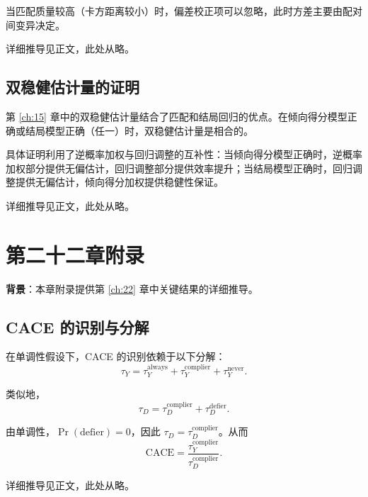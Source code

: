 当匹配质量较高（卡方距离较小）时，偏差校正项可以忽略，此时方差主要由配对间变异决定。

详细推导见正文，此处从略。

\subsection{双稳健估计量的证明}

第 \ref{ch:15} 章中的双稳健估计量结合了匹配和结局回归的优点。在倾向得分模型正确或结局模型正确（任一）时，双稳健估计量是相合的。

具体证明利用了逆概率加权与回归调整的互补性：当倾向得分模型正确时，逆概率加权部分提供无偏估计，回归调整部分提供效率提升；当结局模型正确时，回归调整提供无偏估计，倾向得分加权提供稳健性保证。

详细推导见正文，此处从略。

\section{第二十二章附录}\label{sec:appendix-22-asymptotic-variance}\label{sec:appendix-22-cace-proof}\label{sec:appendix-22-far-ci}\label{sec:appendix-22-itt-identification}\label{sec:appendix-22-jobs-analysis}\label{sec:appendix-22-monotonicity-implication}\label{sec:appendix-22-tau-d-decomposition}\label{sec:appendix-22-tau-y-decomposition}\label{sec:appendix-22-wald-delta-method}

\textbf{背景}：本章附录提供第 \ref{ch:22} 章中关键结果的详细推导。

\subsection{CACE 的识别与分解}

在单调性假设下，CACE 的识别依赖于以下分解：
\[
\tau_Y = \tau_Y^{\mathrm{always}} + \tau_Y^{\mathrm{complier}} + \tau_Y^{\mathrm{never}} .
\]

类似地，
\[
\tau_D = \tau_D^{\mathrm{complier}} + \tau_D^{\mathrm{defier}} .
\]

由单调性，$\Pr(\text{defier}) = 0$，因此 $\tau_D = \tau_D^{\mathrm{complier}}$。从而
\[
\mathrm{CACE} = \frac{\tau_Y^{\mathrm{complier}}}{\tau_D^{\mathrm{complier}}} .
\]

详细推导见正文，此处从略。

